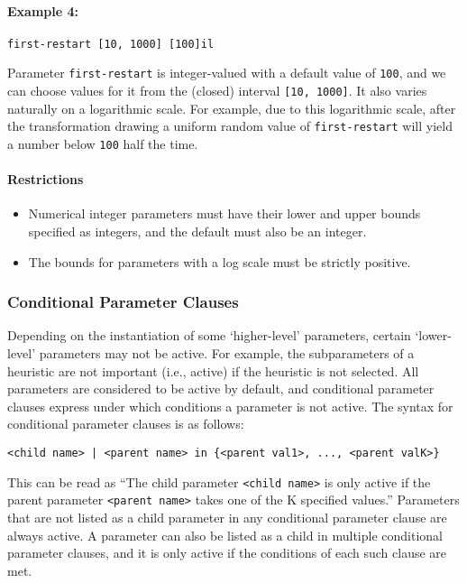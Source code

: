\documentclass[manual.tex]{subfiles}
\begin{document}
\paragraph{Example 4:}
\begin{verbatim}
first-restart [10, 1000] [100]il
\end{verbatim}
Parameter \texttt{first-restart} is integer-valued with a default value of \texttt{100}, and we can choose values for it from the (closed) interval \texttt{[10, 1000]}.
It also varies naturally on a logarithmic scale. For example, due to this logarithmic scale, after the transformation drawing a uniform random value of \texttt{first-restart} will yield a number below \texttt{100} half the time.

\paragraph{Restrictions}
\begin{itemize} 
	\item Numerical integer parameters must have their lower and upper bounds specified as integers, and the default must also be an integer.
	\item The bounds for parameters with a log scale must be strictly positive.
\end{itemize}


\subsubsection{Conditional Parameter Clauses}

Depending on the instantiation of some `higher-level' parameters, certain `lower-level' parameters may not be active.
For example, the subparameters of a heuristic are not important (i.e., active) if the heuristic is not selected.
%
All parameters are considered to be active by default, and conditional parameter clauses express 
under which conditions a parameter is not active. The syntax for conditional parameter clauses is as follows:

\begin{verbatim}
<child name> | <parent name> in {<parent val1>, ..., <parent valK>}
\end{verbatim}
%
This can be read as ``The child parameter \texttt{<child name>} is only active if the parent parameter \texttt{<parent name>} takes one of the K specified values.''
Parameters that are not listed as a child parameter in any conditional parameter clause are always active.
A parameter can also be listed as a child in multiple conditional parameter clauses, and it is only active if the conditions
of each such clause are met.
\end{document}
